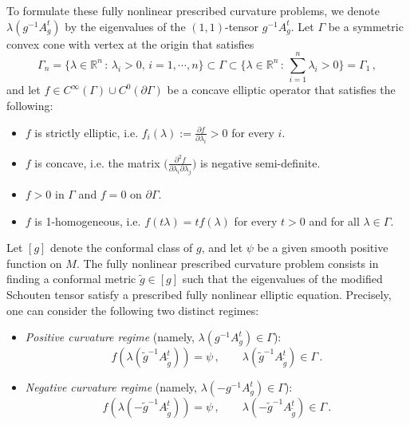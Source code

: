\documentclass{article}
\theoremstyle{plain}
\theoremstyle{definition}
\theoremstyle{definition}
\numberwithin{equation}{section}
\begin{document}
\begin{sloppypar}
To formulate these fully nonlinear prescribed curvature problems, we denote $\lambda(g^{-1}A_{g}^{t})$ by the eigenvalues of the $(1,1)$-tensor $g^{-1}A_{g}^{t}$. Let $\Gamma$ be a  symmetric convex cone with vertex at the origin that satisfies
\[
\Gamma_{n}=\{\lambda\in \mathbb{R}^n\, :\, \lambda_{i}>0, \, i=1,\cdots,n\}\subset \Gamma \subset \{\lambda\in \mathbb{R}^n\, :\, \sum_{i=1}^{n}\lambda_{i}>0\}=\Gamma_{1}\,,
\]
and let $f\in C^{\infty}(\Gamma)\cup C^{0}(\partial\Gamma)$ be a concave elliptic operator that satisfies the following:
\begin{itemize}\itemsep 0.5em
\item[(f1)] $f$ is strictly elliptic, i.e. $f_{i}(\lambda):=\frac{\partial f}{\partial \lambda_{i}}>0$ for every $i$.
\item[(f2)] $f$ is concave, i.e. the matrix $\big(\frac{\partial^2 f}{\partial\lambda_{i}\partial\lambda_{j}}\big)$ is negative semi-definite.
\item[(f3)]  $f>0$ in $\Gamma$ and $f=0$ on $\partial\Gamma$.
\item[(f4)] $f$ is 1-homogeneous, i.e. $f(t\lambda)=tf(\lambda)$ for every $t>0$ and for all $\lambda\in \Gamma$.
\end{itemize}\medskip

Let $[g]$ denote the conformal class of $g$, and let $\psi$ be a given smooth positive  function on $M$. The fully nonlinear prescribed curvature problem consists in finding a conformal metric $\tilde{g} \in [g]$ such that the eigenvalues of the modified Schouten tensor satisfy a prescribed fully nonlinear elliptic equation. Precisely, one can consider the following two distinct regimes:
\begin{itemize}
\item  \textit{Positive curvature regime} (namely, $\lambda(g^{-1}A^{t}_{g})\in \Gamma$):
\begin{equation}\label{positive curvature}
f(\lambda(\tilde{g}^{-1}A^{t}_{\tilde{g}}))=\psi\,, \qquad \lambda(\tilde{g}^{-1}A^{t}_{\tilde{g}})\in \Gamma\,.
\end{equation}
\item \textit{Negative curvature regime} (namely, $\lambda(-g^{-1}A^{t}_{g})\in \Gamma$):
\begin{equation}\label{negative curvature}
f(\lambda(-\tilde{g}^{-1}A^{t}_{\tilde{g}}))=\psi\,, \qquad \lambda(-\tilde{g}^{-1}A^{t}_{\tilde{g}})\in \Gamma\,.
\end{equation}
\end{itemize}\medskip


\end{sloppypar}
\end{document}
